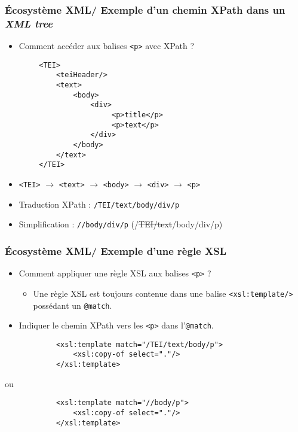 \documentclass{beamer}
\begin{document}
    \begin{frame}[fragile]
    \frametitle{Écosystème XML/ Exemple d'un chemin XPath dans un \textit{XML tree}}
    \begin{itemize}
        \item Comment accéder aux balises \texttt{<p>} avec XPath ?
    \end{itemize}
    \small
    \begin{verbatim}
        <TEI>
            <teiHeader/>
            <text>
                <body>
                    <div>
                         <p>title</p>
                         <p>text</p>
                    </div>
                </body>
            </text>
        </TEI>
    \end{verbatim}
    \normalsize
    \begin{itemize}
              \item \texttt{<TEI>} $\rightarrow$ \texttt{<text>} $\rightarrow$ \texttt{<body>} $\rightarrow$ \texttt{<div>} $\rightarrow$ \texttt{<p>}
              \item Traduction XPath : \texttt{/TEI/text/body/div/p}
              \item Simplification : \texttt{//body/div/p} (/\sout{TEI/text}/body/div/p)
          \end{itemize}
    \end{frame}
      
        \begin{frame}[fragile]
       \frametitle{Écosystème XML/ Exemple d'une règle XSL}
            \begin{itemize}
                \item Comment appliquer une règle XSL aux balises \texttt{<p>} ?
                \begin{itemize}
                    \item Une règle XSL est toujours contenue dans une balise \texttt{<xsl:template/>} possédant un \texttt{@match}.
                \end{itemize}
                \item Indiquer le chemin XPath vers les \texttt{<p>} dans  l'\texttt{@match}.
            \end{itemize}
            \bigskip
            \begin{verbatim}
            <xsl:template match="/TEI/text/body/p">
                <xsl:copy-of select="."/>
            </xsl:template>
            \end{verbatim}
            ou
            \begin{verbatim}
            <xsl:template match="//body/p">
                <xsl:copy-of select="."/>
            </xsl:template>
            \end{verbatim}
       \end{frame}
\end{document}
